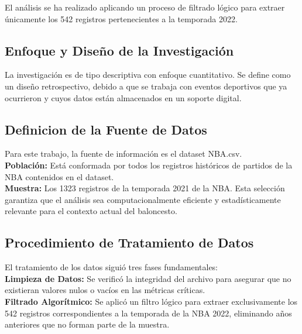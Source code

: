\documentclass[oneside,11pt]{Latex/Classes/PhDthesisPSnPDF}
\begin{document}
El análisis se ha realizado aplicando un proceso de filtrado lógico para
extraer únicamente los 542 registros pertenecientes a la temporada
2022.\\

\subsection{Enfoque y Diseño de la Investigación}

La investigación es de tipo descriptiva con enfoque cuantitativo. Se
define como un diseño retrospectivo, debido a que se trabaja con eventos
deportivos que ya ocurrieron y cuyos datos están almacenados en un
soporte digital.\\

\subsection{Definicion de la Fuente de Datos}

Para este trabajo, la fuente de información es el dataset NBA.csv.\\

\textbf{Población:} Está conformada por todos los registros históricos
de partidos de la NBA contenidos en el dataset.\\

\textbf{Muestra:} Los 1323 registros de la temporada 2021 de la NBA.
Esta selección garantiza que el análisis sea computacionalmente
eficiente y estadísticamente relevante para el contexto actual del
baloncesto.\\

\subsection{Procedimiento de Tratamiento de Datos}

El tratamiento de los datos siguió tres fases fundamentales:\\

\textbf{Limpieza de Datos:} Se verificó la integridad del archivo para
asegurar que no existieran valores nulos o vacíos en las métricas
críticas.\\

\textbf{Filtrado Algorítmico:} Se aplicó un filtro lógico para extraer
exclusivamente los 542 registros correspondientes a la temporada de la
NBA 2022, eliminando años anteriores que no forman parte de la
muestra.\\
\end{document}
